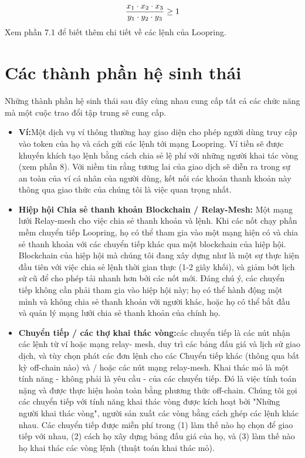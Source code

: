 \documentclass[12pt,a4paper]{article}
\begin{document}
\begin{multicols}{2}
\begin{equation}
{{x_1 \cdot x_2 \cdot x_3 \over y_1 \cdot y_2 \cdot y_3} \geq 1}
\end{equation}
Xem phần 7.1 để biết thêm chi tiết về các lệnh của Loopring.

\section{Các thành phần hệ sinh thái\label{sec:ecosystem}}
Những thành phần hệ sinh thái sau đây cùng nhau cung cấp tất cả các chức năng mà một cuộc trao đổi tập trung sẽ cung cấp.
\begin{itemize}

\item \textbf{Ví:}Một dịch vụ ví thông thường hay giao diện cho phép người dùng truy cập vào token của họ và cách gửi các lệnh tới mạng Loopring. Ví tiền sẽ được khuyến khích tạo lệnh bằng cách chia sẻ lệ phí với những người khai tác vòng (xem phần 8). Với niềm tin rằng tương lai của giao dịch sẽ diễn ra trong sự an toàn của ví cá nhân của người dùng, kết nối các khoản thanh khoản này thông qua giao thức của chúng tôi là việc quan trọng nhất.

\item \textbf{Hiệp hội Chia sẻ thanh khoản Blockchain / Relay-Mesh: } Một mạng lưới Relay-mesh cho việc chia sẻ thanh khoản và lệnh. Khi các nốt chạy phần mềm chuyển tiếp Loopring, họ có thể tham gia vào một mạng hiện có và chia sẻ thanh khoản với các chuyển tiếp khác qua một blockchain của hiệp hội. Blockchain của hiệp hội mà chúng tôi đang xây dựng như là một sự thực hiện đầu tiên với việc chia sẻ lệnh thời gian thực (1-2 giây khối), và giảm bớt lịch sử cũ để cho phép tải nhanh hơn bởi các nốt mới. Đáng chú ý, các chuyển tiếp không cần phải tham gia vào hiệp hội này; họ có thể hành động một mình và không chia sẻ thanh khoản với người khác, hoặc họ có thể bắt đầu và quản lý mạng lưới chia sẻ thanh khoản của chính họ.

\item \textbf{Chuyển tiếp / các thợ khai thác vòng:}các chuyển tiếp là các nút nhận các lệnh từ ví hoặc mạng relay- mesh, duy trì các bảng đấu giá và lịch sử giao dịch, và tùy chọn phát các đơn lệnh cho các Chuyển tiếp khác (thông qua bất kỳ off-chain nào) và / hoặc các nút mạng relay-mesh. Khai thác mỏ là một tính năng - không phải là yêu cầu - của các chuyển tiếp. Đó là việc tính toán nặng và được thực hiện hoàn toàn bằng phương thức off-chain. Chúng tôi gọi các chuyển tiếp với tính năng khai thác vòng được kích hoạt bởi "Những người khai thác vòng", người sản xuất các vòng bằng cách ghép các lệnh khác nhau. Các chuyển tiếp được miễn phí trong (1) làm thế nào họ chọn để giao tiếp với nhau, (2) cách họ xây dựng bảng đấu giá của họ, và (3) làm thế nào họ khai thác các vòng lệnh (thuật toán khai thác mỏ).


\end{itemize}
\end{multicols}
\end{document}
